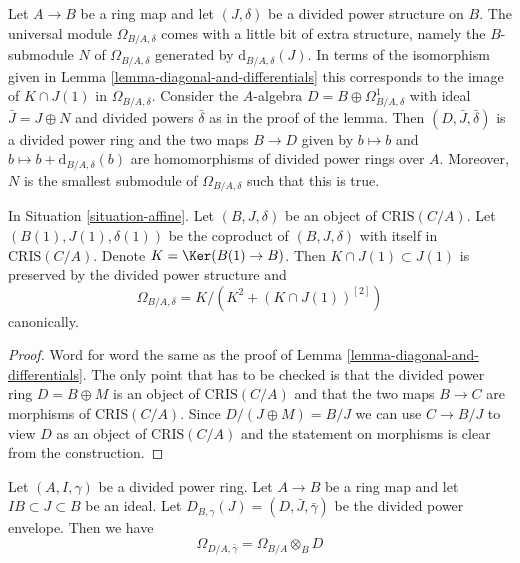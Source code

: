 \begin{remark}
\label{remark-filtration-differentials}
Let $A \to B$ be a ring map and let $(J, \delta)$ be a divided
power structure on $B$. The universal module $\Omega_{B/A, \delta}$
comes with a little bit of extra structure, namely the $B$-submodule
$N$ of $\Omega_{B/A, \delta}$ generated by $\text{d}_{B/A, \delta}(J)$.
In terms of the isomorphism given in
Lemma \ref{lemma-diagonal-and-differentials}
this corresponds to the image of
$K \cap J(1)$ in $\Omega_{B/A, \delta}$. Consider the $A$-algebra
$D = B \oplus \Omega^1_{B/A, \delta}$ with ideal $\bar J = J \oplus N$
and divided powers $\bar \delta$ as in the proof of the lemma.
Then $(D, \bar J, \bar \delta)$ is a divided power ring
and the two maps $B \to D$ given by $b \mapsto b$ and
$b \mapsto b + \text{d}_{B/A, \delta}(b)$
are homomorphisms of divided power rings over $A$. Moreover, $N$
is the smallest submodule of $\Omega_{B/A, \delta}$ such that this is true.
\end{remark}

\begin{lemma}
\label{lemma-diagonal-and-differentials-affine-site}
In Situation \ref{situation-affine}.
Let $(B, J, \delta)$ be an object of $\text{CRIS}(C/A)$.
Let $(B(1), J(1), \delta(1))$ be the coproduct of $(B, J, \delta)$
with itself in $\text{CRIS}(C/A)$. Denote
$K = \Ker(B(1) \to B)$. Then $K \cap J(1) \subset J(1)$
is preserved by the divided power structure and
$$
\Omega_{B/A, \delta} = K/ \left(K^2 + (K \cap J(1))^{[2]}\right)
$$
canonically.
\end{lemma}

\begin{proof}
Word for word the same as the proof of
Lemma \ref{lemma-diagonal-and-differentials}.
The only point that has to be checked is that the
divided power ring $D = B \oplus M$ is an object of $\text{CRIS}(C/A)$
and that the two maps $B \to C$ are morphisms of $\text{CRIS}(C/A)$.
Since $D/(J \oplus M) = B/J$ we can use $C \to B/J$ to view
$D$ as an object of $\text{CRIS}(C/A)$
and the statement on morphisms is clear from the construction.
\end{proof}

\begin{lemma}
\label{lemma-module-differentials-divided-power-envelope}
Let $(A, I, \gamma)$ be a divided power ring. Let $A \to B$ be a ring
map and let $IB \subset J \subset B$ be an ideal. Let
$D_{B, \gamma}(J) = (D, \bar J, \bar \gamma)$ be the divided power envelope.
Then we have
$$
\Omega_{D/A, \bar\gamma} = \Omega_{B/A} \otimes_B D
$$
\end{lemma}

